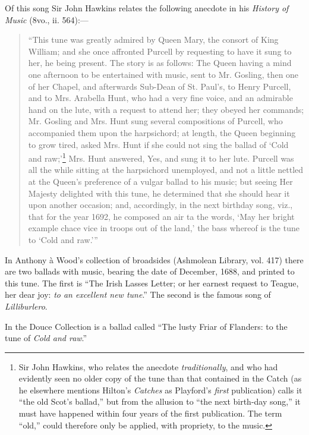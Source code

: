 Of this song Sir John Hawkins relates the following anecdote in his \textit{History of
Music} (8vo., ii. 564):—

\begin{quotation}\small
“This tune was greatly admired by Queen Mary, the consort of King William;
and she once affronted Purcell by requesting to have it sung to her, he being present.
The story is as follows: The Queen having a mind one afternoon to be entertained
with music, sent to Mr. Gosling, then one of her Chapel, and afterwards Sub-Dean of
St. Paul’s, to Henry Purcell, and to Mrs. Arabella Hunt, who had a very fine voice,
and an admirable hand on the lute, with a request to attend her; they obeyed her
commands; Mr. Gosling and Mrs. Hunt sung several compositions of Purcell, who
accompanied them upon the harpsichord; at length, the Queen beginning to grow
tired, asked Mrs. Hunt if she could not sing the ballad of ‘Cold and raw;’\footnote{\textit{}
Sir John Hawkins, who relates the anecdote \textit{traditionally},
and who had evidently seen no older copy of the tune
than that contained in the Catch (as he elsewhere mentions
Hilton’s \textit{Catches} as Playford’s \textit{first} publication) calls
it “the old Scot's ballad,” but from the allusion to “the
next birth-day song,” it must have happened within four
years of the first publication. The term “old,” could
therefore only be applied, with propriety, to the music.}
 Mrs.
Hunt answered, Yes, and sung it to her lute. Purcell was all the while sitting at the
harpsichord unemployed, and not a little nettled at the Queen’s preference of a vulgar
ballad to his music; but seeing Her Majesty delighted with this tune, he determined
that she should hear it upon another occasion; and, accordingly, in the next birthday
song, viz., that for the year 1692, he composed an air ta the words, ‘May her
bright example chace vice in troops out of the land,’ the bass whereof is the tune to
‘Cold and raw.’”
\end{quotation}

In Anthony à Wood’s collection of broadsides (Ashmolean Library, vol. 417)
there are two ballads with music, bearing the date of December, 1688, and
printed to this tune. The first is “The Irish Lasses Letter; or her earnest
request to Teague, her dear joy: \textit{to an excellent new tune}.” The second is the
famous song of \textit{Lilliburlero}.

In the Douce Collection is a ballad called “The lusty Friar of Flanders: to
the tune of \textit{Cold and raw}.”

